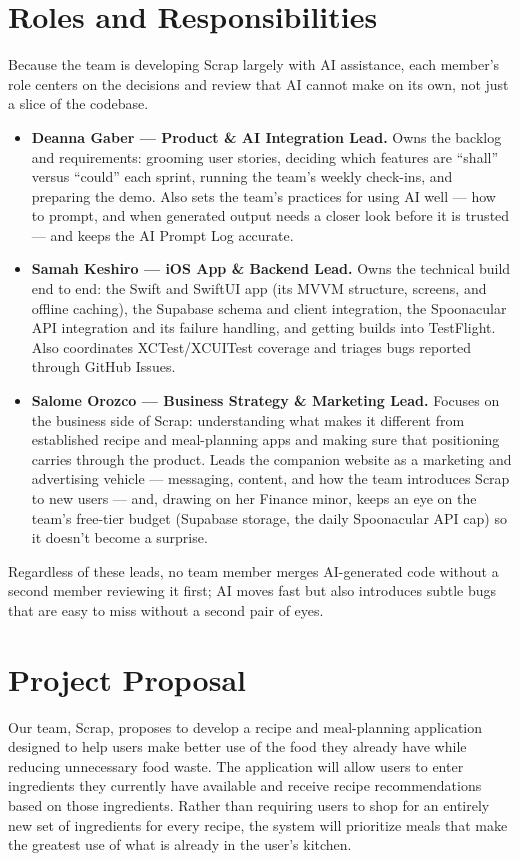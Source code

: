 \section{Roles and Responsibilities}
Because the team is developing Scrap largely with AI assistance, each member's role centers on the decisions and review that AI cannot make on its own, not just a slice of the codebase.
\noindent
\begin{itemize}[leftmargin=1.4em]
\item \textbf{Deanna Gaber --- Product \& AI Integration Lead.} Owns the backlog and requirements: grooming user stories, deciding which features are ``shall'' versus ``could'' each sprint, running the team's weekly check-ins, and preparing the demo. Also sets the team's practices for using AI well --- how to prompt, and when generated output needs a closer look before it is trusted --- and keeps the AI Prompt Log accurate.

\item \textbf{Samah Keshiro --- iOS App \& Backend Lead.} Owns the technical build end to end: the Swift and SwiftUI app (its MVVM structure, screens, and offline caching), the Supabase schema and client integration, the Spoonacular API integration and its failure handling, and getting builds into TestFlight. Also coordinates XCTest/XCUITest coverage and triages bugs reported through GitHub Issues.

\item \textbf{Salome Orozco --- Business Strategy \& Marketing Lead.} Focuses on the business side of Scrap: understanding what makes it different from established recipe and meal-planning apps and making sure that positioning carries through the product. Leads the companion website as a marketing and advertising vehicle --- messaging, content, and how the team introduces Scrap to new users --- and, drawing on her Finance minor, keeps an eye on the team's free-tier budget (Supabase storage, the daily Spoonacular API cap) so it doesn't become a surprise.
\end{itemize}

\noindent Regardless of these leads, no team member merges AI-generated code without a second member reviewing it first; AI moves fast but also introduces subtle bugs that are easy to miss without a second pair of eyes.

\section{Project Proposal}
Our team, Scrap, proposes to develop a recipe and meal-planning application designed to help users make better use of the food they already have while reducing unnecessary food waste. The application will allow users to enter ingredients they currently have available and receive recipe recommendations based on those ingredients. Rather than requiring users to shop for an entirely new set of ingredients for every recipe, the system will prioritize meals that make the greatest use of what is already in the user's kitchen.

